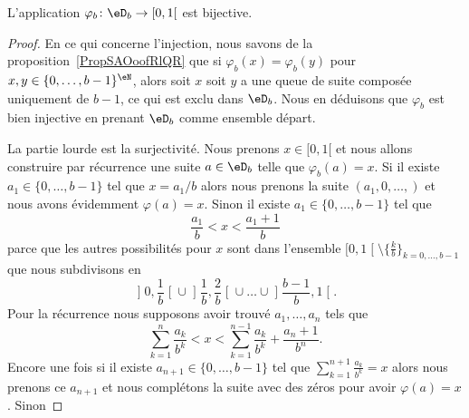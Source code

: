 \begin{theorem} \label{ThoRXBootpUpd}
	L'application \( \varphi_b\colon \eD_b\to \mathopen[ 0 , 1 [\) est bijective.
\end{theorem}

\begin{proof}
	En ce qui concerne l'injection, nous savons de la proposition~\ref{PropSAOoofRlQR} que si \( \varphi_b(x)=\varphi_b(y)\) pour \( x,y\in\{ 0,\ldots, b-1 \}^{\eN}\), alors soit \( x\) soit \( y\) a une queue de suite composée uniquement de \( b-1\), ce qui est exclu dans \( \eD_b\). Nous en déduisons que \( \varphi_b\) est bien injective en prenant \( \eD_b\) comme ensemble départ.

	La partie lourde est la surjectivité. Nous prenons \( x\in \mathopen[ 0 , 1 [\) et nous allons construire par récurrence une suite \( a\in \eD_b\) telle que \( \varphi_b(a)=x\). Si il existe \( a_1\in\{ 0,\ldots, b-1 \}\) tel que \( x=a_1/b\) alors nous prenons la suite \( (a_1,0,\ldots, )\) et nous avons évidemment \( \varphi(a)=x\). Sinon il existe \( a_1\in\{ 0,\ldots, b-1 \}\) tel que
	\begin{equation}
		\frac{ a_1 }{ b }<x<\frac{ a_1+1 }{ b }
	\end{equation}
	parce que les autres possibilités pour \( x\) sont dans l'ensemble \( \mathopen[ 0 , 1 \mathclose[\setminus\{ \frac{ k }{ b } \}_{k=0,\ldots, b-1}\) que nous subdivisons en
	\begin{equation}
		\mathopen] 0 , \frac{1}{ b } \mathclose[\cup\mathopen] \frac{1}{ b } , \frac{ 2 }{ b } \mathclose[\cup\ldots\cup\mathopen] \frac{ b-1 }{ b } , 1 \mathclose[.
	\end{equation}
	Pour la récurrence nous supposons avoir trouvé \( a_1,\ldots, a_n\) tels que
	\begin{equation}
		\sum_{k=1}^n\frac{ a_k }{ b^k }< x<\sum_{k=1}^{n-1}\frac{ a_k }{ b^k }+\frac{ a_n+1 }{ b^n }.
	\end{equation}
	Encore une fois si il existe \( a_{n+1}\in\{ 0,\ldots, b-1 \}\) tel que \( \sum_{k=1}^{n+1}\frac{ a_k }{ b^k }=x\) alors nous prenons ce \( a_{n+1}\) et nous complétons la suite avec des zéros pour avoir \( \varphi(a)=x\). Sinon

\end{proof}
